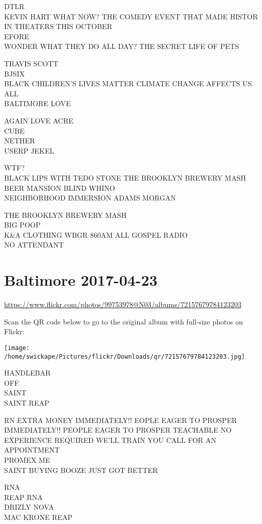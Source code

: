 \documentclass[10pt,letterpaper]{article}
\begin{document}
DTLR\\
KEVIN HART WHAT NOW?  THE COMEDY EVENT THAT MADE HISTOR IN THEATERS THIS OCTOBER\\
EFORE\\
WONDER WHAT THEY DO ALL DAY?  THE SECRET LIFE OF PETS

TRAVIS SCOTT\\
BJSIX\\
BLACK CHILDREN'S LIVES MATTER CLIMATE CHANGE AFFECTS US ALL\\
BALTIMORE LOVE

AGAIN LOVE ACRE\\
CUBE\\
NETHER\\
USERP JEKEL

WTF?\\
BLACK LIPS WITH TEDO STONE THE BROOKLYN BREWERY MASH\\
BEER MANSION BLIND WHINO\\
NEIGHBORHOOD IMMERSION ADAMS MORGAN

THE BROOKLYN BREWERY MASH\\
BIG POOP\\
K\&A CLOTHING WBGR 860AM ALL GOSPEL RADIO\\
NO ATTENDANT


\section*{Baltimore 2017-04-23}

\url{https://www.flickr.com/photos/99753978@N03/albums/72157679784123203}

Scan the QR code below to go to the original album with full-size photos on Flickr:

\texttt{[image: /home/swickape/Pictures/flickr/Downloads/qr/72157679784123203.jpg]}


HANDLEBAR\\
OFF\\
SAINT\\
SAINT REAP

RN EXTRA MONEY IMMEDIATELY!! EOPLE EAGER TO PROSPER\\
IMMEDIATELY!!  PEOPLE EAGER TO PROSPER TEACHABLE NO EXPERIENCE REQUIRED WE'LL TRAIN YOU CALL FOR AN APPOINTMENT\\
PROMEX ME\\
SAINT BUYING BOOZE JUST GOT BETTER

RNA\\
REAP RNA\\
DRIZLY NOVA\\
MAC KRONE REAP
\end{document}

